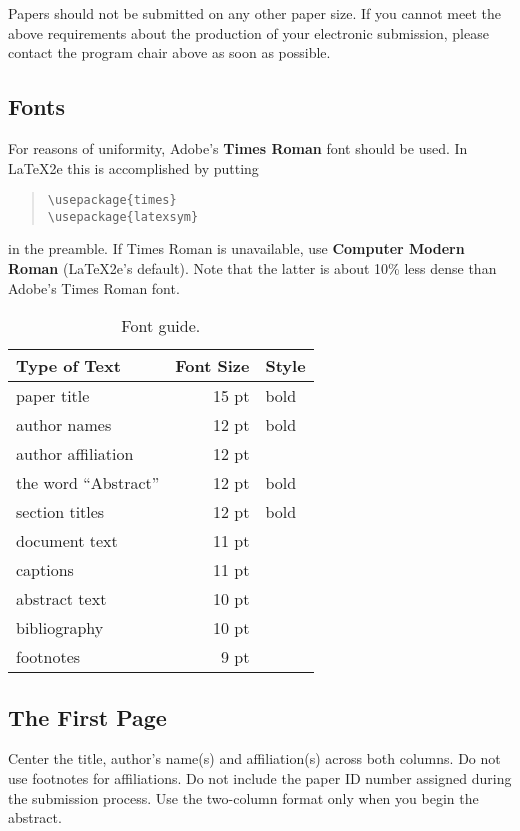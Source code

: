 \documentclass[11pt]{article}
\begin{document}
\noindent Papers should not be submitted on any other paper size.
 If you cannot meet the above requirements about the production of your electronic submission, 
please contact the program chair above as soon as possible.

\subsection{Fonts}
\label{ssec:fonts}
For reasons of uniformity, Adobe's {\bf Times Roman} font should be
used. In \LaTeX2e{} this is accomplished by putting

\begin{quote}
\begin{verbatim}
\usepackage{times}
\usepackage{latexsym}
\end{verbatim}
\end{quote}
in the preamble. If Times Roman is unavailable, use {\bf Computer
  Modern Roman} (\LaTeX2e{}'s default).  Note that the latter is about
  10\% less dense than Adobe's Times Roman font.


\begin{table}[h]
\begin{center}
\begin{tabular}{|l|rl|}
\hline \bf Type of Text & \bf Font Size & \bf Style \\ \hline
paper title & 15 pt & bold \\
author names & 12 pt & bold \\
author affiliation & 12 pt & \\
the word ``Abstract'' & 12 pt & bold \\
section titles & 12 pt & bold \\
document text & 11 pt  &\\
captions & 11 pt & \\
abstract text & 10 pt & \\
bibliography & 10 pt & \\
footnotes & 9 pt & \\
\hline
\end{tabular}
\end{center}
\caption{\label{font-table} Font guide. }
\end{table}

\subsection{The First Page}
\label{ssec:first}

Center the title, author's name(s) and affiliation(s) across both
columns. Do not use footnotes for affiliations. Do not include the
paper ID number assigned during the submission process. Use the
two-column format only when you begin the abstract.
\end{document}
